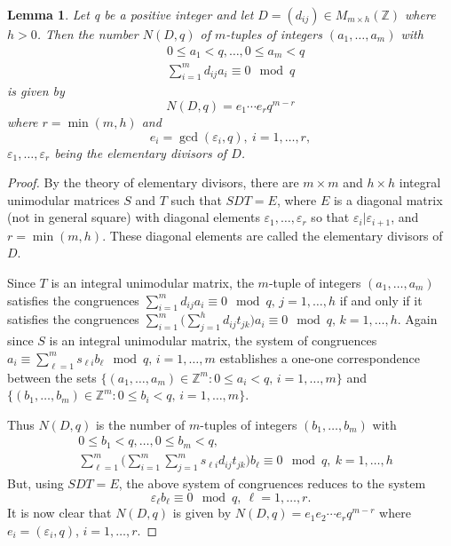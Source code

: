 \documentclass[11pt]{article}
\newtheorem{lemma}[theorem]{Lemma}
\theoremstyle{definition}
\theoremstyle{proof}
\begin{document}
\begin{lemma}\label{N(D, q)}
    Let q be a positive integer and let $D = (d_{ij}) \in M_{m \times h}(\mathbb{Z})$ where $h>0$.
    Then the number $N(D, q)$ of $m$-tuples of integers $(a_1, \ldots, a_m)$ with
    \begin{align*}
        & 0 \leq a_1 < q, \ldots, 0 \leq  a_m < q \\
        & \sum_{i=1}^{m} d_{ij} a_i \equiv 0 \mod q
    \end{align*}
    is given by
    \[
        N(D, q) = e_1 \cdots e_r q^{m-r}
    \]
    where $r = \min (m, h)$ and
    \[
        e_i = \gcd (\varepsilon _i, q), \ i = 1, \ldots, r,
    \]
    $\varepsilon_1, \ldots, \varepsilon _r$ being the elementary divisors of $D$. 
\end{lemma}
\begin{proof}
    By the theory of elementary divisors, there are $m \times m$ and $h \times h$ integral unimodular matrices $S$ and $T$ such that $SDT = E$, where $E$ is a diagonal matrix (not in general square) with diagonal elements $\varepsilon _1, \ldots, \varepsilon _r$ so that $\varepsilon _i | \varepsilon _{i+1}$, and $r= \min (m, h)$.
    These diagonal elements are called the elementary divisors of $D$.

    Since $T$ is an integral unimodular matrix, the $m$-tuple of integers $(a_1, \ldots, a_m)$ satisfies the congruences $\sum\limits_{i=1}^{m} d_{ij}a_i \equiv 0 \mod q, \, j= 1, \ldots, h$ if and only if it satisfies the congruences $\sum\limits_{i=1}^{m}\Big(\sum\limits_{j=1}^{h}d_{ij}t_{jk}\Big)a_i \equiv 0 \mod q, \, k=1, \ldots, h$.
    Again since $S$ is an integral unimodular matrix, the system of congruences $a_i \equiv \sum\limits_{\ell=1}^{m}s_{\ell i}b_\ell \mod q, \, i=1, \ldots, m$ establishes a one-one correspondence between the sets $\big\{(a_1, \ldots, a_m) \in \mathbb{Z}^{m} : 0 \leq a_i < q, \, i = 1, \ldots, m\big\}$ and $\big\{(b_1, \ldots, b_m) \in \mathbb{Z}^{m} : 0 \leq b_i < q, \, i = 1, \ldots, m\big\}$.

    Thus $N(D, q)$ is the number of $m$-tuples of integers $(b_1, \ldots, b_m)$ with
    \begin{align*}
        & 0 \leq b_1 < q, \ldots, 0 \leq b_m < q, \\
        & \sum_{\ell=1}^{m}\bigg(\sum_{i=1}^{m}\sum_{j=1}^{m} s_{\ell i}d_{ij} t_{jk} \bigg) b_\ell \equiv 0 \mod q, \ k=1, \ldots, h
    \end{align*}
    But, using $SDT=E$, the above system of congruences reduces to the system
    \[
        \varepsilon _\ell b_\ell \equiv 0 \mod q, \ \ell = 1, \ldots, r.
    \]
    It is now clear that $N(D, q)$ is given by $N(D, q) = e_1 e_2 \cdots e_r q^{m-r}$ where $e_i= (\varepsilon _i, q)$, $i=1, \ldots, r$.
\end{proof}
\end{document}
